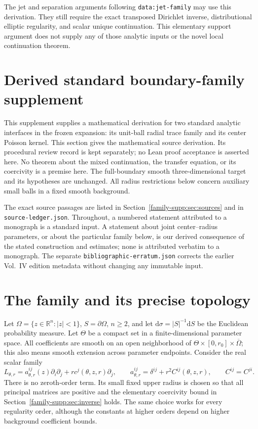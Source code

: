 \documentclass[11pt]{article}
\theoremstyle{definition}
\theoremstyle{remark}
\newcommand{\R}{\mathbb R}
\newcommand{\dd}{\mathrm d}
\numberwithin{equation}{section}
\providecommand{\tht}{\theta}
\begin{document}
The jet and separation arguments following \texttt{data:jet-family} may
use this derivation. They still require the exact transposed Dirichlet
inverse, distributional elliptic regularity, and scalar unique continuation.
This elementary support argument does not supply any of those analytic
inputs or the novel local continuation theorem.

\clearpage
\section{Derived standard boundary-family supplement}



This supplement supplies a mathematical derivation for two standard analytic
interfaces in the frozen expansion: its unit-ball radial trace family and
its center Poisson kernel. This section gives the mathematical source derivation. Its procedural review
record is kept separately; no Lean proof acceptance is asserted here. No theorem about the mixed
continuation, the transfer equation, or its coercivity is a premise here.
The full-boundary smooth three-dimensional target and its hypotheses are
unchanged. All radius restrictions below concern auxiliary small balls in
a fixed smooth background.

The exact source passages are listed in Section~\ref{family-supp:sec:sources} and in
\texttt{source-ledger.json}. Throughout, a numbered statement attributed to a
monograph is a standard input. A statement about joint center--radius
parameters, or about the particular family below, is our derived consequence
of the stated construction and estimates; none is attributed verbatim to a
monograph. The separate \texttt{bibliographic-erratum.json} corrects the
earlier Vol.~IV edition metadata without changing any immutable input.

\section{The family and its precise topology}\label{family-supp:sec:interface}

Let $\Omega=\{z\in\R^n:|z|<1\}$, $S=\partial\Omega$, $n\geq2$, and let
$\dd\sigma=|S|^{-1}\dd S$ be the Euclidean probability measure. Let $\Theta$
be a compact set in a finite-dimensional parameter space. All coefficients
are smooth on an open neighborhood of $\Theta\times[0,r_0]\times\overline
\Omega$; this also means smooth extension across parameter endpoints.
Consider the real scalar family
\begin{equation}\label{family-supp:eq:family}
 L_{\tht,r}=a^{ij}_{\tht,r}(z)\partial_i\partial_j
                  +r c^j(\tht,z,r)\partial_j,
 \qquad a^{ij}_{\tht,r}=\delta^{ij}+r^2 C^{ij}(\tht,z,r),
 \qquad C^{ij}=C^{ji}.
\end{equation}
There is no zeroth-order term. Its small fixed upper radius is chosen so
that all principal matrices are positive and the elementary coercivity
bound in Section~\ref{family-supp:sec:inverse} holds. The same choice works for every
regularity order, although the constants at higher orders depend on higher
background coefficient bounds.
\end{document}
